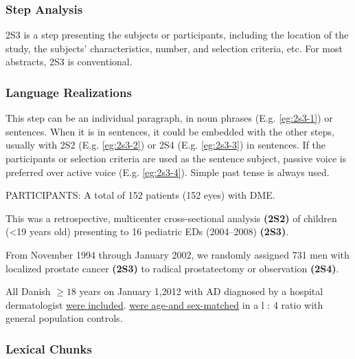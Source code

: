 \documentclass[a4paper]{ctexbook}
\begin{document}
    \subsubsection{Step Analysis}

    2S3 is a step presenting the subjects or participants, including the location of the study, the subjects' characteristics, number, and selection criteria, etc. For most abstracts, 2S3 is conventional.

    \subsubsection{Language Realizations}

    This step can be an individual paragraph, in noun phrases (E.g. \ref{eg:2s3-1}) or sentences. When it is in sentences, it could be embedded with the other steps, usually with 2S2 (E.g. \ref{eg:2s3-2}) or 2S4 (E.g. \ref{eg:2s3-3}) in sentences. If the participants or selection criteria are used as the sentence subject, passive voice is preferred over active voice (E.g. \ref{eg:2s3-4}). Simple past tense is always used.

    \begin{eg}[label={eg:2s3-1}]{}
      PARTICIPANTS: A total of 152 patients (152 eyes) with DME.
    \end{eg}

    \begin{eg}[label={eg:2s3-2}]{}
      This was a retrospective, multicenter cross-sectional analysis \textbf{(2S2)} of children (<19 years old) presenting to 16 pediatric EDs (2004--2008) \textbf{(2S3)}.
    \end{eg}

    \begin{eg}[label={eg:2s3-3}]{}
      From November 1994 through January 2002, we randomly assigned 731 men with localized prostate cancer \textbf{(2S3)} to radical prostatectomy or observation \textbf{(2S4)}.
    \end{eg}

    \begin{eg}[label={eg:2s3-4}]{}
      All Danish  $\geqslant 18$ years on January 1,2012 with AD diagnosed by a hospital dermatologist \uline{were included}.  \uline{were age-and sex-matched} in a l : 4 ratio with general population controls.
    \end{eg}

    \subsubsection{Lexical Chunks}
\end{document}
